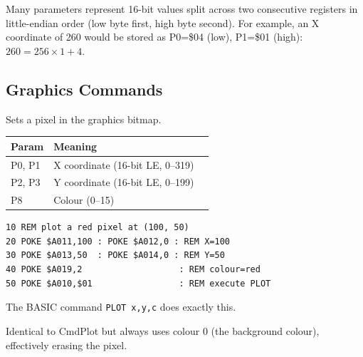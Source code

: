 \begin{notebox}
Many parameters represent 16-bit values split across two consecutive registers
in little-endian order (low byte first, high byte second).  For example, an
X coordinate of 260 would be stored as P0=\$04 (low), P1=\$01 (high):
$260 = 256 \times 1 + 4$.
\end{notebox}


\subsection{Graphics Commands}
\label{sec:vgc-gfx-cmds}



Sets a pixel in the graphics bitmap.

\begin{center}
\small
\begin{tabular}{@{}lll@{}}
\toprule
\textbf{Param} & \textbf{Meaning} \\
\midrule
P0, P1 & X coordinate (16-bit LE, 0--319) \\
P2, P3 & Y coordinate (16-bit LE, 0--199) \\
P8     & Colour (0--15) \\
\bottomrule
\end{tabular}
\end{center}

\begin{lstlisting}
10 REM plot a red pixel at (100, 50)
20 POKE $A011,100 : POKE $A012,0 : REM X=100
30 POKE $A013,50  : POKE $A014,0 : REM Y=50
40 POKE $A019,2                   : REM colour=red
50 POKE $A010,$01                 : REM execute PLOT
\end{lstlisting}

\begin{notebox}
The BASIC command \texttt{PLOT x,y,c} does exactly this.
\end{notebox}



Identical to CmdPlot but always uses colour 0 (the background colour),
effectively erasing the pixel.

